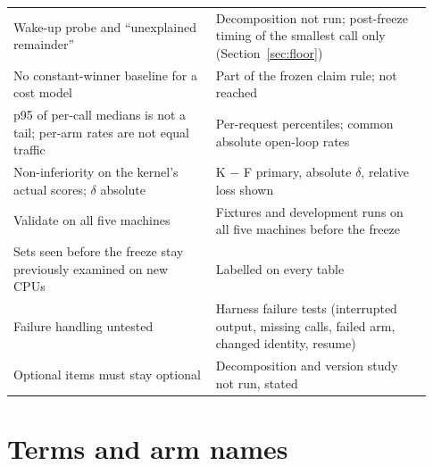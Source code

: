 \begin{small}
\begin{longtable}{p{0.45\linewidth}p{0.48\linewidth}}
Wake-up probe and ``unexplained remainder'' & Decomposition not run; post-freeze timing of the smallest call only (Section~\ref{sec:floor}) \\
No constant-winner baseline for a cost model & Part of the frozen claim rule; not reached \\
p95 of per-call medians is not a tail; per-arm rates are not equal traffic & Per-request percentiles; common absolute open-loop rates \\
Non-inferiority on the kernel's actual scores; $\delta$ absolute & K $-$ F primary, absolute $\delta$, relative loss shown \\
Validate on all five machines & Fixtures and development runs on all five machines before the freeze \\
Sets seen before the freeze stay previously examined on new CPUs & Labelled on every table \\
Failure handling untested & Harness failure tests (interrupted output, missing calls, failed arm, changed identity, resume) \\
Optional items must stay optional & Decomposition and version study not run, stated \\
\bottomrule
\end{longtable}
\addtocounter{table}{-1}%
\end{small}

\section{Terms and arm names}
\label{app:terms}

